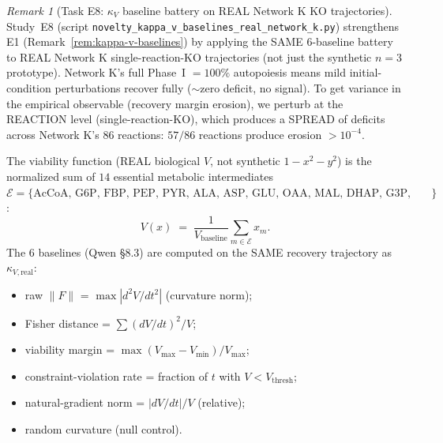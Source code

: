 \documentclass[11pt,a4paper]{article}
\theoremstyle{plain}
\theoremstyle{definition}
\theoremstyle{remark}
\newtheorem{remark}[theorem]{Remark}
\newcommand{\kk}{\kappa_{\!V}}
\begin{document}
\begin{remark}[Task E8: $\kk$ baseline battery on REAL Network K KO
trajectories]
\label{rem:kappa-v-real-network-k-v5}
Study~E8 (script
\texttt{novelty\_kappa\_v\_baselines\_real\_network\_k.py})
strengthens E1 (Remark~\ref{rem:kappa-v-baselines}) by applying the
SAME $6$-baseline battery to REAL Network K single-reaction-KO
trajectories (not just the synthetic $n{=}3$ prototype). Network K's
full Phase~I $= 100\%$ autopoiesis means mild initial-condition
perturbations recover fully ($\sim$zero deficit, no signal). To get
variance in the empirical observable (recovery margin erosion), we
perturb at the REACTION level (single-reaction-KO), which produces a
SPREAD of deficits across Network K's $86$ reactions: $57/86$
reactions produce erosion $> 10^{-4}$.

The viability function (REAL biological $V$, not synthetic
$1{-}x^2{-}y^2$) is the normalized sum of $14$ essential metabolic
intermediates $\mathcal{E} = \{\text{AcCoA, G6P, FBP, PEP, PYR, ALA,
ASP, GLU, OAA, MAL, DHAP, G3P, Glycogen, PolyP}\}$:
\[
  V(x) \;=\; \frac{1}{V_{\mathrm{baseline}}} \sum_{m \in \mathcal{E}} x_m.
\]
The $6$ baselines (Qwen \S 8.3) are computed on the SAME recovery
trajectory as $\kappa_{V,\mathrm{real}}$:
\begin{itemize}
\item[(1)] raw $\|F\|$ = $\max |d^2 V / dt^2|$ (curvature norm);
\item[(2)] Fisher distance = $\sum (dV/dt)^2 / V$;
\item[(3)] viability margin = $\max (V_{\max} - V_{\min}) / V_{\max}$;
\item[(4)] constraint-violation rate = fraction of $t$ with $V < V_{\mathrm{thresh}}$;
\item[(5)] natural-gradient norm = $|dV/dt| / V$ (relative);
\item[(6)] random curvature (null control).
\end{itemize}


\end{remark}
\end{document}
